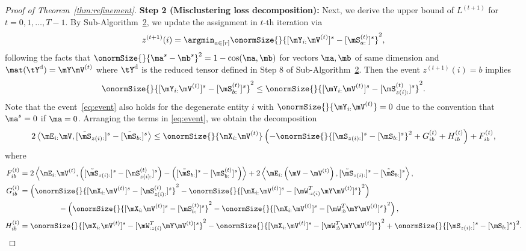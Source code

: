\documentclass[lettersize,onecolumn,journal]{IEEEtran}
\theoremstyle{definition}
\theoremstyle{definition}
\newcommand{\of}[1]{\left(#1\right)}
\newcommand{\off}[1]{\left[#1\right]}
\newcommand{\ang}[1]{\left\langle#1\right\rangle}
\begin{document}
\begin{proof}[Proof of Theorem~\ref{thm:refinement}]
{\bf Step 2 (Misclustering loss decomposition):} Next, we derive the upper bound of $L^{(t+1)}$ for $t = 0 ,1, \ldots, T-1$. By Sub-Algorithm~\hyperref[alg:main]{2}, we update the assignment in $t$-th iteration via
    \begin{equation}
        z^{(t+1)}(i) = \argmin_{a \in [r]} \onormSize{}{ [ \mY_{i:} \mV^{(t)}  ]^s - [\mS_{a:}^{(t)}]^s }^2,
    \end{equation}
    following the facts that $\onormSize{}{\ma^s - \mb^s}^2 = 1 - \cos(\ma, \mb)$ for vectors $\ma,\mb$ of same dimension and $\mat(\tY^\text{d}) = \mY \mV^{(t)}$ where $\tY^\text{d}$ is the reduced tensor defined in Step 8 of Sub-Algorithm~\hyperref[alg:main]{2}. Then the event $z^{(t+1)}(i) = b$ implies
    \begin{equation}\label{eq:event}
        \onormSize{}{ [ \mY_{i:} \mV^{(t)}  ]^s - [\mS_{b:}^{(t)}]^s }^2 \leq \onormSize{}{ [ \mY_{i:} \mV^{(t)}  ]^s - [\mS_{z(i):}^{(t)}]^s }^2.
    \end{equation}
    {\color{blue} Note that the event~\eqref{eq:event} also holds for the degenerate entity $i$ with $\onormSize{}{\mY_{i:} \mV^{(t)}} = 0$ due to the convention that $\ma^s = 0$ if $\ma = 0$. }
    Arranging the terms in \eqref{eq:event}, we obtain the decomposition
    \begin{equation}\label{eq:decomp}
        2 \ang{ \mE_{i:} \mV, [  \tilde \mS_{z(i):} ]^s - [  \tilde \mS_{b:} ]^s } \leq \onormSize{}{\mX_{i:} \mV^{(t)}} \of{ - \onormSize{}{ [ \mS_{z(i):}  ]^s - [ \mS_{b:}  ]^s  }^2 + G_{ib}^{(t)} + H_{ib}^{(t)} } +  F_{ib}^{(t)},
    \end{equation}
    where
    \begin{align}
        F_{ib}^{(t)} &= 2 \ang{\mE_{i:} \mV^{(t)}, \of{ [  \tilde \mS_{z(i):} ]^s  -  [  \mS_{z(i):}^{(t)} ]^s  }  - \of{  [  \tilde \mS_{b:} ]^s  -  [  \mS_{b:}^{(t)} ]^s  }  }  + 2 \ang{ \mE_{i:} \of{ \mV - \mV^{(t)} }, [  \tilde \mS_{z(i):} ]^s - [  \tilde \mS_{b:} ]^s  }, \label{eq:f}\\
        G_{ib}^{(t)} &=   \of{ \onormSize{}{ [\mX_{i:} \mV^{(t)}]^s -  [  \mS_{z(i):}^{(t)}  ]^s}^2 -  \onormSize{}{ [\mX_{i:} \mV^{(t)}]^s -  [  \mW_{:z(i)}^T \mY \mV^{(t)} ]^s}^2}   \\
        & \quad \quad \quad \quad \quad -   \of{ \onormSize{}{ [\mX_{i:} \mV^{(t)}]^s -  [  \mS_{b:}^{(t)}  ]^s}^2 -  \onormSize{}{ [\mX_{i:} \mV^{(t)}]^s -  [  \mW_{:b}^T \mY \mV^{(t)} ]^s}^2 }, \label{eq:g} \\
        H_{ib}^{(t)} &=   \onormSize{}{ [\mX_{i:} \mV^{(t)}]^s -  [  \mW_{:z(i)}^T \mY \mV^{(t)} ]^s}^2 - \onormSize{}{ [\mX_{i:} \mV^{(t)}]^s -  [  \mW_{:b}^T \mY \mV^{(t)} ]^s}^2  + \onormSize{}{ [ \mS_{z(i):}  ]^s - [ \mS_{b:}  ]^s  }^2 . \label{eq:h}
    \end{align}
    

\end{proof}
\end{document}
